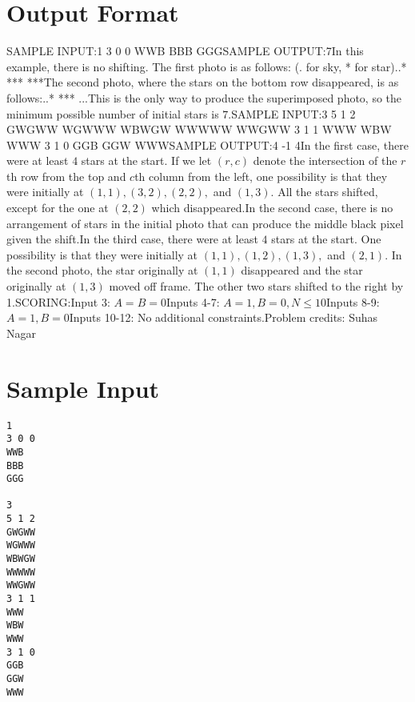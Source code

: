 \documentclass[12pt]{article}
\begin{document}
\section*{Output Format}
SAMPLE INPUT:1
3 0 0
WWB
BBB
GGGSAMPLE OUTPUT:7In this example, there is no shifting. The first photo is as follows: (. for
sky, * for star)..*
***
***The second photo, where the stars on the bottom row disappeared, is as follows:..*
***
...This is the only way to produce the superimposed photo, so the minimum possible
number of initial stars is $7$.SAMPLE INPUT:3
5 1 2
GWGWW
WGWWW
WBWGW
WWWWW
WWGWW
3 1 1
WWW
WBW
WWW
3 1 0
GGB
GGW
WWWSAMPLE OUTPUT:4
-1
4In the first case, there were at least $4$ stars at the start. If we let $(r,c)$
denote the intersection of the $r$th row from the top and $c$th column from the
left, one possibility is that they were initially at $(1,1), (3,2), (2,2),$  and
$(1,3)$. All the stars shifted, except for the one at $(2,2)$ which disappeared.In the second case, there is no arrangement of stars in the initial photo that
can produce the middle black pixel given the shift.In the third case, there were at least $4$ stars at the start. One possibility
is that they were initially at $(1,1), (1,2), (1,3),$ and $(2,1)$. In the second
photo, the star originally at $(1,1)$ disappeared and the star originally at
$(1,3)$ moved off frame. The other two stars shifted to the right by 1.SCORING:Input 3: $A=B=0$Inputs 4-7: $A=1, B=0, N\le 10$Inputs 8-9: $A=1, B=0$Inputs 10-12: No additional constraints.Problem credits: Suhas Nagar

\section*{Sample Input}
\begin{verbatim}
1
3 0 0
WWB
BBB
GGG

3
5 1 2
GWGWW
WGWWW
WBWGW
WWWWW
WWGWW
3 1 1
WWW
WBW
WWW
3 1 0
GGB
GGW
WWW
\end{verbatim}
\end{document}
